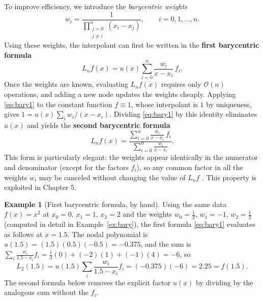 \documentclass[12pt, a4paper]{article}
\theoremstyle{plain}
\theoremstyle{definition}
\newtheorem{example}[theorem]{Example}
\theoremstyle{remark}
\begin{document}
To improve efficiency, we introduce the \emph{barycentric weights}
\begin{equation}\label{eq:weights}
    w_i = \frac{1}{\displaystyle\prod_{\substack{j=0 \\ j \neq i}}^n (x_i - x_j)}, \qquad i = 0, 1, \dots, n .
\end{equation}
Using these weights, the interpolant can first be written in the \textbf{first barycentric formula}
\begin{equation}\label{eq:bary1}
    L_n f(x) = u(x) \sum_{i=0}^n \frac{w_i}{x - x_i}\, f_i .
\end{equation}
Once the weights are known, evaluating $L_n f(x)$ requires only $\mathcal{O}(n)$ operations, and adding a new node updates the weights cheaply. Applying \eqref{eq:bary1} to the constant function $f \equiv 1$, whose interpolant is $1$ by uniqueness, gives $1 = u(x)\sum_i w_i/(x-x_i)$. Dividing \eqref{eq:bary1} by this identity eliminates $u(x)$ and yields the \textbf{second barycentric formula}
\begin{equation}\label{eq:bary2}
    L_n f(x) = \frac{\displaystyle\sum_{i=0}^n \frac{w_i}{x - x_i}\, f_i}{\displaystyle\sum_{i=0}^n \frac{w_i}{x - x_i}} .
\end{equation}
This form is particularly elegant: the weights appear identically in the numerator and denominator (except for the factors $f_i$), so any common factor in all the weights $w_i$ may be canceled without changing the value of $L_n f$ \cite{micula4, berrut}. This property is exploited in Chapter 5.

\begin{example}[First barycentric formula, by hand]\label{ex:bary1}
Using the same data $f(x)=x^2$ at $x_0=0,\,x_1=1,\,x_2=2$ and the weights $w_0=\tfrac12,\,w_1=-1,\,w_2=\tfrac12$ (computed in detail in Example~\ref{ex:bary}), the first formula \eqref{eq:bary1} evaluates as follows at $x=1.5$. The nodal polynomial is $u(1.5)=(1.5)(0.5)(-0.5)=-0.375$, and the sum is $\sum_i \tfrac{w_i}{1.5-x_i}f_i = \tfrac13(0) + (-2)(1) + (-1)(4) = -6$, so
\[
    L_2(1.5) = u(1.5)\sum_{i}\frac{w_i}{1.5-x_i}f_i = (-0.375)(-6) = 2.25 = f(1.5).
\]
The second formula below removes the explicit factor $u(x)$ by dividing by the analogous sum without the $f_i$.
\end{example}
\end{document}
